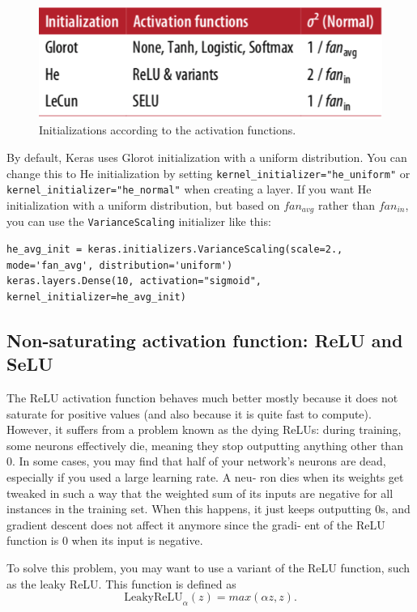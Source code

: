 \documentclass[12pt, letterpaper]{article}
\theoremstyle{definition}
\begin{document}
\begin{figure}
\centering
\includegraphics[scale=0.4]{img/initialization}
\caption{Initializations according to the activation functions.}
\label{fig:initial}
\end{figure}
By default, Keras uses Glorot initialization with a uniform distribution. You can change this to He initialization by setting \lstinline+kernel_initializer="he_uniform"+ or \lstinline+kernel_initializer="he_normal"+ when creating a layer.
If you want He initialization with a uniform distribution, but based on $fan_{avg}$ rather
than $fan_{in}$, you can use the \lstinline+VarianceScaling+ initializer like this:
\begin{lstlisting}
he_avg_init = keras.initializers.VarianceScaling(scale=2., mode='fan_avg', distribution='uniform')
keras.layers.Dense(10, activation="sigmoid", kernel_initializer=he_avg_init)
\end{lstlisting}

\subsection{Non-saturating activation function: ReLU and SeLU}
The ReLU activation function behaves much better mostly because it does not saturate for positive values (and also because it is quite fast to compute). 
However, it suffers from a problem known as the dying ReLUs: during training, some neurons effectively die, meaning they stop outputting anything other than 0. In some cases, you may find that half of your network’s neurons are dead, especially if you used a large learning rate. A neu‐ ron dies when its weights get tweaked in such a way that the weighted sum of its inputs are negative for all instances in the training set. When this happens, it just keeps outputting 0s, and gradient descent does not affect it anymore since the gradi‐ ent of the ReLU function is 0 when its input is negative.

To solve this problem, you may want to use a variant of the ReLU function, such as the leaky ReLU. This function is defined as
\begin{equation}
\text{LeakyReLU}_\alpha(z) = max(\alpha z, z).
\end{equation}
\end{document}
